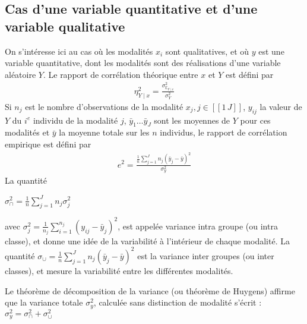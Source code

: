 \documentclass[letterpaper,10pt,french]{sphinxmanual}
\begin{document}
\subsection{Cas d’une variable quantitative et d’une variable qualitative}
\label{\detokenize{statsdescriptives:cas-d-une-variable-quantitative-et-d-une-variable-qualitative}}
\sphinxAtStartPar
On s’intéresse ici au cas où les modalités \(x_i\) sont qualitatives, et où \(y\) est une variable quantitative, dont les modalités sont des réalisations d’une variable aléatoire \(Y\).
Le rapport de corrélation théorique entre \(x\) et \(Y\) est défini par
\begin{equation*}
\begin{split}\eta^2_{Y\mid x} = \frac{\sigma^2_{\mathbb{E}_{Y\mid x}}}{\sigma^2_Y}\end{split}
\end{equation*}
\sphinxAtStartPar
Si \(n_j\) est le nombre d’observations de la modalité \(x_j,j\in[\![1\,J]\!]\), \(y_{ij}\) la valeur de \(Y\) du \(i^e\) individu de la modalité \(j\), \(\bar{y}_1\ldots \bar{y}_J\) sont les moyennes de \(Y\) pour ces modalités et \(\bar{y}\) la moyenne totale sur les \(n\) individus, le rapport de corrélation empirique est défini par
\begin{equation*}
\begin{split}e^2 = \frac{\frac{1}{n}\displaystyle\sum_{j=1}^J n_j\left (\bar{y}_j-\bar{y}\right )^2}{\sigma^2_y}\end{split}
\end{equation*}
\sphinxAtStartPar
La quantité

\sphinxAtStartPar
\(\sigma^2_\cap = \frac{1}{n}\displaystyle\sum_{j=1}^J n_j\sigma_j^2\)

\sphinxAtStartPar
avec \(\sigma_j^2 =  \frac{1}{n_j}\displaystyle\sum_{i=1}^{n_j}\left (y_{ij}-\bar{y}_j \right )^2\),  est appelée variance intra groupe (ou intra classe), et donne une idée de la variabilité à l’intérieur de chaque modalité.
La quantité
\(\sigma_\cup = \frac{1}{n}\displaystyle\sum_{j=1}^J n_j\left (\bar{y}_j-\bar{y}\right )^2\)
est la variance inter groupes (ou inter classes), et mesure la variabilité entre les différentes modalités.

\sphinxAtStartPar
Le théorème de décomposition de la variance (ou théorème de Huygens) affirme que la variance totale \(\sigma^2_y\), calculée sans distinction de modalité s’écrit :
\(\sigma^2_y = \sigma^2_\cap + \sigma^2_\cup\)
\end{document}
